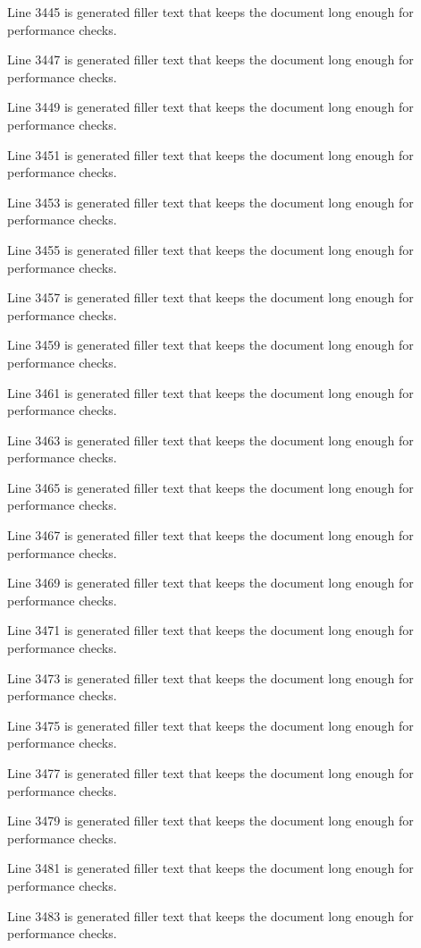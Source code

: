 Line 3445 is generated filler text that keeps the document long enough for performance checks.

Line 3447 is generated filler text that keeps the document long enough for performance checks.

Line 3449 is generated filler text that keeps the document long enough for performance checks.

Line 3451 is generated filler text that keeps the document long enough for performance checks.

Line 3453 is generated filler text that keeps the document long enough for performance checks.

Line 3455 is generated filler text that keeps the document long enough for performance checks.

Line 3457 is generated filler text that keeps the document long enough for performance checks.

Line 3459 is generated filler text that keeps the document long enough for performance checks.

Line 3461 is generated filler text that keeps the document long enough for performance checks.

Line 3463 is generated filler text that keeps the document long enough for performance checks.

Line 3465 is generated filler text that keeps the document long enough for performance checks.

Line 3467 is generated filler text that keeps the document long enough for performance checks.

Line 3469 is generated filler text that keeps the document long enough for performance checks.

Line 3471 is generated filler text that keeps the document long enough for performance checks.

Line 3473 is generated filler text that keeps the document long enough for performance checks.

Line 3475 is generated filler text that keeps the document long enough for performance checks.

Line 3477 is generated filler text that keeps the document long enough for performance checks.

Line 3479 is generated filler text that keeps the document long enough for performance checks.

Line 3481 is generated filler text that keeps the document long enough for performance checks.

Line 3483 is generated filler text that keeps the document long enough for performance checks.

